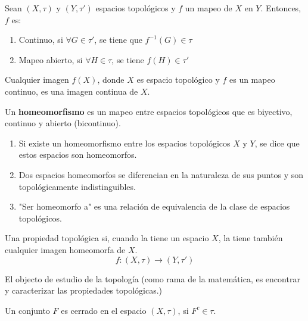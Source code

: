 \begin{definicion}
    Sean $(X,\tau)$ y $(Y,\tau')$ espacios topológicos y $f$ un mapeo de $X$ en $Y$. Entonces, $f$ es:
    \begin{enumerate}
        \item Continuo, si $\forall G\in\tau'$, se tiene que $f^{-1}(G)\in \tau $
        \item Mapeo abierto, si $\forall H\in \tau$, se tiene $f(H)\in \tau'$
    \end{enumerate}
\end{definicion}

\begin{nota}
    Cualquier imagen $f(X)$, donde $X$ es espacio topológico y $f$ es un mapeo continuo, es una imagen continua de $X$. 
\end{nota}

\begin{definicion}
    Un \textbf{homeomorfismo} es un mapeo entre espacios topológicos que es biyectivo, continuo y abierto (bicontinuo). 
\end{definicion}

\begin{nota}
    \begin{enumerate}
        \item Si existe un homeomorfismo entre los espacios topológicos $X$ y $Y$, se dice que estos espacios son homeomorfos. 
        \item Dos espacios homeomorfos se diferencian en la naturaleza de sus puntos y son topológicamente indistinguibles. 
        \item "Ser homeomorfo a" es una relación de equivalencia de la clase de espacios topológicos. 
    \end{enumerate}
\end{nota}

\begin{definicion}
    Una propiedad topológica si, cuando la tiene un espacio $X$, la tiene también cualquier imagen homeomorfa de $X$. 
    $$f:(X,\tau)\to (Y,\tau')$$
\end{definicion}

\begin{nota}
    El objecto de estudio de la topología (como rama de la matemática, es encontrar y caracterizar las propiedades topológicas.)
\end{nota}

\begin{definicion}
    Un conjunto $F$ es cerrado en el espacio $(X,\tau)$, si $F^c\in\tau$. 
\end{definicion}

